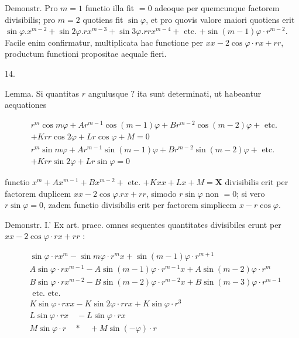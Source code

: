 \documentclass[twoside,12pt, showframe]{memoir}
\begin{document}
Demonstr. Pro \(m=1\) functio illa fit \(=0\) adeoque per quemcunque factorem divisibilis; pro \(m=2\) quotiens fit \(\sin \varphi\), et pro quovis valore maiori quotiens erit \(\sin \varphi . x^{m-2}+\sin 2 \varphi . r x^{m-3}+\sin 3 \varphi . r r x^{m-4}+\) etc. \(+\sin (m-1) \varphi \cdot r^{m-2}\). Facile enim confirmatur, multiplicata hac functione per \(x x-2 \cos \varphi \cdot r x+r r\), productum functioni propositae aequale fieri.

14.

Lemma. Si quantitas \(r\) angulusque \(?\) ita sunt determinati, ut habeantur aequationes

\[
\begin{aligned}
& r^{m} \cos m \varphi+A r^{m-1} \cos (m-1) \varphi+B r^{m-2} \cos (m-2) \varphi+\text { etc. } \\
&+K r r \cos 2 \varphi+L r \cos \varphi+M=0 \\
& r^{m} \sin m \varphi+A r^{m-1} \sin (m-1) \varphi+B r^{m-2} \sin (m-2) \varphi+\text { etc. } \\
&+K r r \sin 2 \varphi+L r \sin \varphi=0
\end{aligned}
\]

functio \(x^{m}+A x^{m-1}+B x^{m-2}+\) etc. \(+K x x+L x+M=\mathbf{X}\) divisibilis erit per factorem duplicem \(x x-2 \cos \varphi . r x+r r\), simodo \(r \sin \varphi\) non \(=0\); si vero \(r \sin \varphi=0\), zadem functio divisibilis erit per factorem simplicem \(x-r \cos \varphi\).

Demonstr. I.' Ex art. praec. omnes sequentes quantitates divisibiles erunt per \(x x-2 \cos \varphi \cdot r x+r r\) :

\[
\begin{aligned}
& \sin \varphi \cdot r x^{m}-\sin m \varphi \cdot r^{m} x+\sin (m-1) \varphi \cdot r^{m+1} \\
& A \sin \varphi \cdot r x^{m-1}-A \sin (m-1) \varphi \cdot r^{m-1} x+A \sin (m-2) \varphi \cdot r^{m} \\
& B \sin \varphi \cdot r x^{m-2}-B \sin (m-2) \varphi \cdot r^{m-2} x+B \sin (m-3) \varphi \cdot r^{m-1} \\
& \text { etc. etc. } \\
& K \sin \varphi \cdot r x x-K \sin 2 \varphi \cdot r r x+K \sin \varphi \cdot r^{3} \\
& L \sin \varphi \cdot r x \quad-L \sin \varphi \cdot r x \\
& M \sin \varphi \cdot r \quad * \quad+M \sin (-\varphi) \cdot r
\end{aligned}
\]
\end{document}

